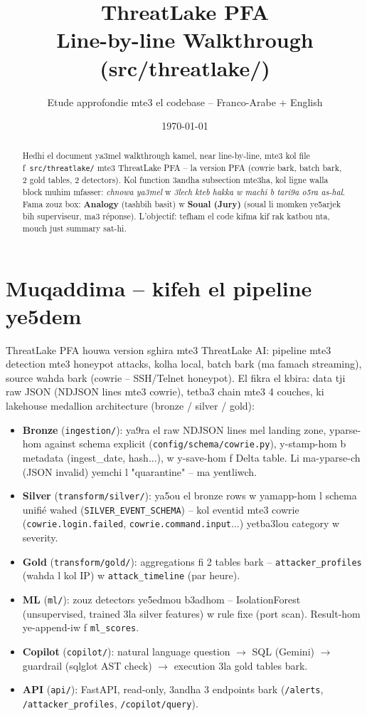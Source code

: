 \documentclass[11pt,a4paper]{report}
\title{\color{amber}\Huge ThreatLake PFA\\[6pt]\LARGE Line-by-line Walkthrough (src/threatlake/)}
\author{Etude approfondie mte3 el codebase -- Franco-Arabe + English}
\date{\today}
\DeclareRobustCommand{\code}[1]{\texttt{#1}}
\DeclareRobustCommand{\file}[1]{\texttt{\color{amber}#1}}
\begin{document}
\maketitle
\thispagestyle{empty}

\begin{abstract}
\noindent Hedhi el document ya3mel walkthrough kamel, near line-by-line, mte3
kol file f\ \file{src/threatlake/} mte3 ThreatLake PFA -- la version PFA (cowrie
bark, batch bark, 2 gold tables, 2 detectors). Kol function 3andha subsection
mte3ha, kol ligne walla block muhim mfasser: \emph{chnowa ya3mel} w
\emph{3lech kteb hakka w machi b tari9a o5ra as-hal}. Fama zouz box: \textbf{Analogy}
(tashbih basit) w \textbf{Soual (Jury)} (soual li momken ye5arjek bih superviseur,
ma3 réponse). L'objectif: tefham el code kifma kif rak katbou nta, mouch just
summary sat-hi.
\end{abstract}

\tableofcontents

\chapter{Muqaddima -- kifeh el pipeline ye5dem}

ThreatLake PFA houwa version sghira mte3 ThreatLake AI: pipeline mte3 detection
mte3 honeypot attacks, kolha local, batch bark (ma fama\-ch streaming), source
wahda bark (cowrie -- SSH/Telnet honeypot). El fikra el kbira: data tji raw JSON
(NDJSON lines mte3 cowrie), tetba3 chain mte3 4 couches, ki lakehouse medallion
architecture (bronze / silver / gold):

\begin{itemize}
  \item \textbf{Bronze} (\file{ingestion/}): ya9ra el raw NDJSON lines mel landing
        zone, yparse-hom against schema explicit (\file{config/schema/cowrie.py}),
        y-stamp-hom b metadata (ingest\_date, hash...), w y-save-hom f Delta table.
        Li ma-yparse-ch (JSON invalid) yemchi l "quarantine" -- ma yentliw\-ch.
  \item \textbf{Silver} (\file{transform/silver/}): ya5ou el bronze rows w
        ya\-mapp-hom l schema unifié wahed (\code{SILVER\_EVENT\_SCHEMA}) -- kol
        eventid mte3 cowrie (\code{cowrie.login.failed}, \code{cowrie.command.input}...)
        yetba3lou category w severity.
  \item \textbf{Gold} (\file{transform/gold/}): aggregations fi 2 tables bark --
        \code{attacker\_profiles} (wahda l kol IP) w \code{attack\_timeline}
        (par heure).
  \item \textbf{ML} (\file{ml/}): zouz detectors ye5edmou b3adhom -- IsolationForest
        (unsupervised, trained 3la silver features) w rule fixe (port scan).
        Result-hom ye-append-iw f \code{ml\_scores}.
  \item \textbf{Copilot} (\file{copilot/}): natural language question $\to$ SQL
        (Gemini) $\to$ guardrail (sqlglot AST check) $\to$ execution 3la gold
        tables bark.
  \item \textbf{API} (\file{api/}): FastAPI, read-only, 3andha 3 endpoints bark
        (\code{/alerts}, \code{/attacker\_profiles}, \code{/copilot/query}).
\end{itemize}
\end{document}
